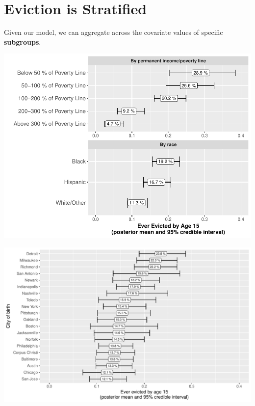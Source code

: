 \documentclass{beamer}
\newcommand\bblue[1]{{\color{blue}\textbf{#1}}}
\begin{document}
\section{Eviction is Stratified}

\begin{frame}
\centering \Large
Given our model, we can aggregate across the covariate values of specific \bblue{subgroups}.
\end{frame}

\begin{frame}
\includegraphics[width = \textwidth]{figures/RaceIncomeGroups_largeFont}
\end{frame}

\begin{frame}
\includegraphics[width = \textwidth]{figures/ByCity}
\end{frame}
\end{document}
